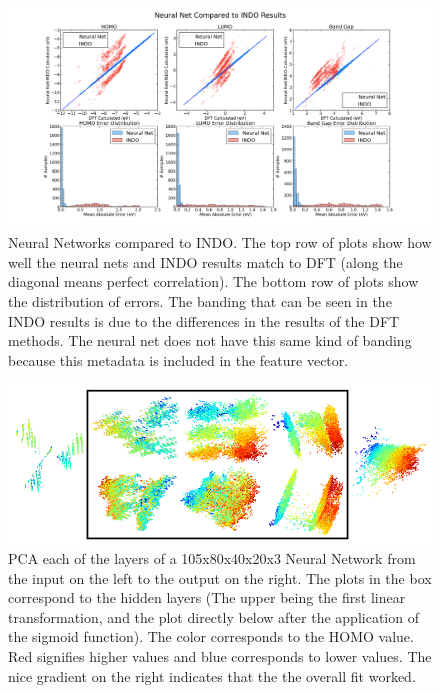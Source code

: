 \documentclass[10pt, oneside]{article}   	%
\begin{document}
\begin{figure}[H]
\begin{center}
\includegraphics [width=.8\textwidth]{neural-default-indo.png}
\caption{Neural Networks compared to INDO. The top row of plots show how well the neural nets and INDO results match to DFT (along the diagonal means perfect correlation). The bottom row of plots show the distribution of errors. The banding that can be seen in the INDO results is due to the differences in the results of the DFT methods. The neural net does not have this same kind of banding because this metadata is included in the feature vector.}\label{NN-indo}
\end{center}
\end{figure}

\begin{figure}[H]
\begin{center}
\includegraphics [width=.9\textwidth]{nnpca.png}
\caption{PCA each of the layers of a 105x80x40x20x3 Neural Network from the input on the left to the output on the right. The plots in the box correspond to the hidden layers (The upper being the first linear transformation, and the plot directly below after the application of the sigmoid function). The color corresponds to the HOMO value. Red signifies higher values and blue corresponds to lower values. The nice gradient on the right indicates that the the overall fit worked.}\label{nnpca}
\end{center}
\end{figure}
\end{document}
